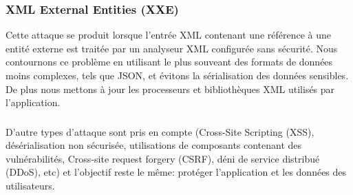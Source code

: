     \subsubsection{XML External Entities (XXE)}   
    Cette attaque se produit lorsque l'entrée XML contenant une référence à une entité externe est 
    traitée par un analyseur XML configurée sans sécurité. 
    Nous contournons ce problème en utilisant le plus souveant des formats de données moins complexes, tels que JSON, 
    et évitons la sérialisation des données sensibles. De plus nous mettons à jour les processeurs et bibliothèques 
    XML utilisés par l'application.

    \subsubsection{}
    \paragraph{}
    D'autre types d'attaque sont pris en compte (Cross-Site Scripting (XSS), 
    désérialisation non sécurisée, utilisations de composants contenant des vulnérabilités,
    Cross-site request forgery (CSRF), déni de service distribué (DDoS), etc) 
    et l'objectif reste le même: protéger l'application et les données des utilisateurs.
    



